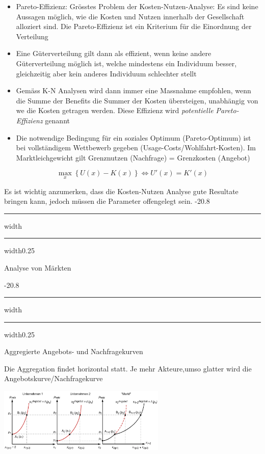 \documentclass[9pt, landscape, fleqn]{scrartcl}
\makeatletter
\renewcommand{\section}{\@startsection{section}{1}{0mm}%
{-2\baselineskip}{0.8\baselineskip}%
{\hrule depth 0.2pt width\columnwidth\hrule depth1.5pt
width0.25\columnwidth\vspace*{1.2em}\Large\bfseries\rmfamily}}
\renewcommand{\subsection}{\@startsection{subsection}{1}{0mm}%
{-2\baselineskip}{0.8\baselineskip}%
{\hrule depth 0.2pt width\columnwidth\hrule depth0.75pt
width0.25\columnwidth\vspace*{1.2em}\large\bfseries\rmfamily}}
\makeatother
\begin{document}
\begin{multicols*}{3}
\begin{itemize}
    \item Pareto-Effizienz: Grösstes Problem der Kosten-Nutzen-Analyse: Es sind keine Aussagen möglich, wie die Kosten und Nutzen innerhalb der Gesellschaft alloziert sind. Die Pareto-Effizienz ist ein Kriterium für die Einordnung der Verteilung
    \item Eine Güterverteilung gilt dann als effizient, wenn keine andere Güterverteilung möglich ist, welche mindestens ein Individuum besser, gleichzeitig aber kein anderes Individuum schlechter stellt 
    \item Gemäss K-N Analysen wird dann immer eine Massnahme empfohlen, wenn die Summe der Benefits die Summer der Kosten übersteigen, unabhängig von we die Kosten getragen werden. Diese Effizienz wird \emph{potentielle Pareto-Effizienz} genannt
    \item Die notwendige Bedingung für ein soziales Optimum (Pareto-Optimum) ist bei vollständigem Wettbewerb gegeben (Usage-Costs/Wohlfahrt-Kosten). Im Marktleichgewicht gilt Grenznutzen (Nachfrage) = Grenzkosten (Angebot)
\end{itemize}

\begin{equation}
    \max\limits_x\left\{U(x)-K(x)\right\} \Leftrightarrow U'(x) = K'(x)
\end{equation}

Es ist wichtig anzumerken, dass die Kosten-Nutzen Analyse gute Resultate bringen kann, jedoch müssen die Parameter offengelegt sein.
\section{Analyse von Märkten}

\subsection{Aggregierte Angebots- und Nachfragekurven}

Die Aggregation findet horizontal statt. Je mehr Akteure,umso glatter wird die Angebotskurve/Nachfragekurve

\begin{center}
    \includegraphics[width=8cm]{Angebotskurve_Aggregiert.png}
\end{center}


\end{multicols*}
\end{document}
